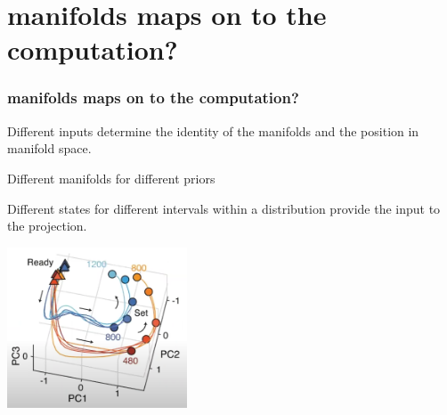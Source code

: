 \documentclass{beamer}
\begin{document}
\section{manifolds maps on to the computation?}
\begin{frame}
\frametitle{\textbf{manifolds maps on to the computation?} }
Different inputs determine the identity of the manifolds and the position in manifold space.


Different manifolds for different priors

Different states for different intervals within a distribution provide the input to the projection.

\centering
\begin{minipage}{1\textwidth}
    \centering
    \includegraphics[width=0.4\textwidth]{images/Sohn_et_al-2019_04.PNG} %
\end{minipage}

\end{frame}

\end{document}
